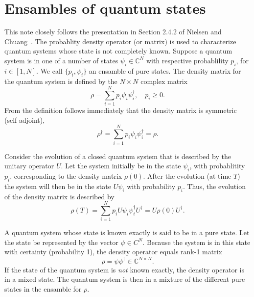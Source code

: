 \documentclass[11pt]{article}
\begin{document}



\section{Ensambles of quantum states}

This note closely follows the presentation in Section 2.4.2 of Nielsen and
Chuang~\cite{Nielsen-Chuang}.  The probablity density operator (or matrix) is used to characterize
quantum systems whose state is not completely known. Suppose a quantum system is in one of a number
of states $\psi_i\in{\mathbb C}^N$ with respective probablility $p_i$, for $i\in[1,N]$. We call
$\{p_i, \psi_i\}$ an ensamble of pure states. The density matrix for the quantum system is defined
by the $N\times N$ complex matrix
\[
\rho = \sum_{i=1}^N p_i \psi_i \psi_i^\dag,\quad p_i \geq 0.
\]
From the definition follows immediately that the density matrix is symmetric (self-adjoint),
\[
\rho^\dag = \sum_{i=1}^N p_i \psi_i \psi_i^\dag = \rho.
\]

Consider the evolution of a closed quantum system that is described by the unitary operator $U$. Let
the system initially be in the state $\psi_i$, with probablitity $p_i$, corresponding to the density
matrix $\rho(0)$. After the evolution (at time $T$) the system will then be in the state $U\psi_i$
with probability $p_i$. Thus, the evolution of the density matrix is described by
\[
\rho(T) = \sum_{i=1}^N p_i U \psi_i \psi_i^\dag U^\dag =  U \rho(0) U^\dag.
\]

A quantum system whose state is known exactly is said to be in a pure state. Let the state be
represented by the vector $\psi\in C^N$. Because the system is in this state with certainty
(probability 1), the density operator equals rank-1 matrix
\[
\rho = \psi \psi^\dag \in {\mathbb C}^{N\times N}.
\]
If the state of the quantum system is {\em not} known exactly, the density operator is in
a mixed state. The quantum system is then in a mixture of the different pure states in the ensamble for $\rho$.
\end{document}
